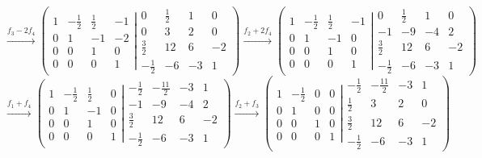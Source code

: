 \documentclass[a4paper,12pt]{article}
\begin{document}
$$
\xrightarrow[]{f_3-2f_4}
\left ( \left.\begin{matrix}
    1 & -\frac{1}{2} & \frac{1}{2} & -1 \\ 
    0 & 1 & -1 & -2 \\
    0 & 0 & 1 & 0 \\ 
    0 & 0 & 0 & 1
    \end{matrix}\right| \begin{matrix}
    0 & \frac{1}{2} & 1 & 0 \\ 
    0 & 3 & 2 & 0 \\
    \frac{3}{2} & 12 & 6 & -2 \\ 
    -\frac{1}{2} & -6 & -3 & 1
    \end{matrix}\right )
\xrightarrow[]{f_2+2f_4}
\left ( \left.\begin{matrix}
    1 & -\frac{1}{2} & \frac{1}{2} & -1 \\ 
    0 & 1 & -1 & 0 \\
    0 & 0 & 1 & 0 \\ 
    0 & 0 & 0 & 1
    \end{matrix}\right| \begin{matrix}
    0 & \frac{1}{2} & 1 & 0 \\ 
    -1 & -9 & -4 & 2 \\
    \frac{3}{2} & 12 & 6 & -2 \\ 
    -\frac{1}{2} & -6 & -3 & 1
    \end{matrix}\right )
$$
$$
\xrightarrow[]{f_1+f_4}
\left ( \left.\begin{matrix}
    1 & -\frac{1}{2} & \frac{1}{2} & 0 \\ 
    0 & 1 & -1 & 0 \\
    0 & 0 & 1 & 0 \\ 
    0 & 0 & 0 & 1
    \end{matrix}\right| \begin{matrix}
    -\frac{1}{2} & -\frac{11}{2} & -3 & 1 \\ 
    -1 & -9 & -4 & 2 \\
    \frac{3}{2} & 12 & 6 & -2 \\ 
    -\frac{1}{2} & -6 & -3 & 1
    \end{matrix}\right )
\xrightarrow[]{f_2+f_3}
\left ( \left.\begin{matrix}
    1 & -\frac{1}{2} & 0 & 0 \\ 
    0 & 1 & 0 & 0 \\
    0 & 0 & 1 & 0 \\ 
    0 & 0 & 0 & 1
    \end{matrix}\right| \begin{matrix}
    -\frac{1}{2} & -\frac{11}{2} & -3 & 1 \\ 
    \frac{1}{2} & 3 & 2 & 0 \\
    \frac{3}{2} & 12 & 6 & -2 \\ 
    -\frac{1}{2} & -6 & -3 & 1
    \end{matrix}\right )
$$
\end{document}
